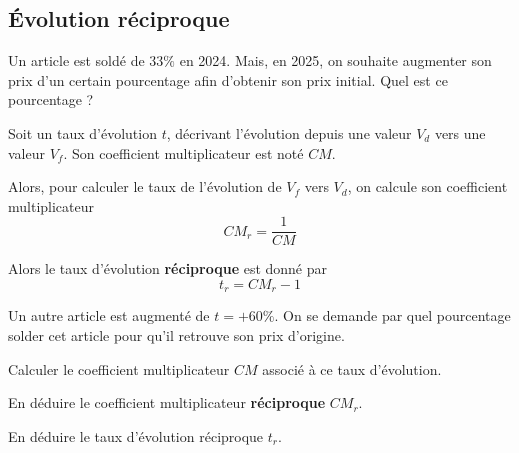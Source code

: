 \documentclass{poly}
\begin{document}
\subsection{Évolution réciproque}
\begin{example}
Un article est soldé de $33\%$ en 2024. Mais, en 2025, on souhaite augmenter son prix d'un certain pourcentage afin d'obtenir son prix initial. Quel est ce pourcentage ?

\begin{center}
\end{center}
\end{example}
\begin{proposition}
Soit un taux d'évolution $t$, décrivant l'évolution depuis une valeur $V_d$ vers une valeur $V_f$. Son coefficient multiplicateur est noté $CM$. 

Alors, pour calculer le taux de l'évolution de $V_f$ vers $V_d$, on calcule son coefficient multiplicateur
\begin{equation*}
CM_r = \dfrac{1}{CM}
\end{equation*}

Alors le taux d'évolution \textbf{réciproque} est donné par
\begin{equation*}
t_r = CM_r - 1
\end{equation*}
\end{proposition}
\begin{example}
Un autre article est augmenté de $t = +60\%$. On se demande par quel pourcentage solder cet article pour qu'il retrouve son prix d'origine.
\begin{alphaquestions}
\item Calculer le coefficient multiplicateur $CM$ associé à ce taux d'évolution.
\item En déduire le coefficient multiplicateur \textbf{réciproque} $CM_r$.
\item En déduire le taux d'évolution réciproque $t_r$.
\end{alphaquestions}
\vspace*{0.5cm}

\end{example}
\end{document}
